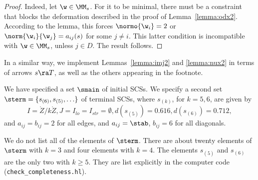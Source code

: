 \begin{proof}
Indeed, let
$\w\in \MM_s$.  For it to be minimal, there must be a constraint
that blocks the  deformation described in the proof of
Lemma~\ref{lemma:odx2}.
According to the lemma, this forces $\normo{\w_i}=2$ or
$\norm{\w_i}{\w_j}=a_{ij}(s)$ for some $j\ne i$.  This latter
condition
is incompatible with $\w\in \MM_s$, unless $j\in D$.  The result
follows.
\end{proof}


In a similar way, we implement Lemmas~\ref{lemma:imj2} and \ref{lemma:nux2} 
in terms of arrows $s\ra T$, as well as the others appearing in the footnote.

\begin{remark}
We have specified a set $\smain$ of initial SCSs.
We specify a second set $\sterm=\{s_{(6)},s_{(5)},\ldots\}$ 
of terminal SCSs, where
 $s_{(k)}$, for $k=5,6$,  are given by
\[
I=\ring{Z}/k\ring{Z}, J=I_{lo}=I_{str}=\emptyset, d(s_{(5)})=0.616, d(s_{(6)})=0.712,
\]
and $a_{ij}=b_{ij}=2$ for all edges, 
and $a_{ij}=\stab$, $b_{ij}=6$ for all diagonals.

We do not list all of the elements of $\sterm$.  There are about twenty
elements of $\sterm$ with $k=3$ and four elements with $k=4$.  The elements
$s_{(5)}$ and $s_{(6)}$ are the only two with $k\ge 5$.
They are list explicitly
in the computer code (\verb!check_completeness.hl!).
\end{remark}


